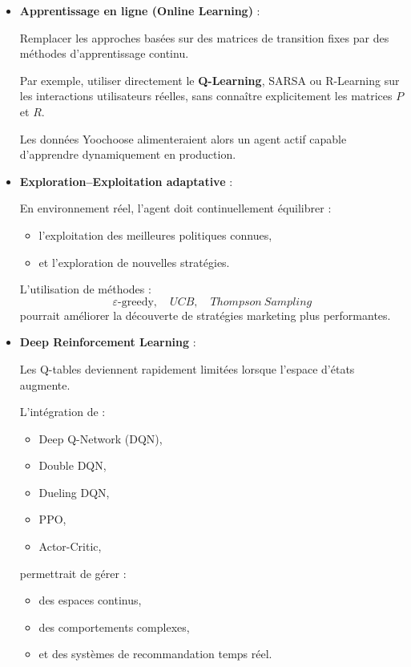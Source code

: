 \documentclass[11pt,a4paper]{article}
\begin{document}
\begin{itemize}

\item \textbf{Apprentissage en ligne (Online Learning)} :

Remplacer les approches basées
sur des matrices de transition fixes
par des méthodes d’apprentissage continu.

Par exemple,
utiliser directement le \textbf{Q-Learning},
SARSA ou R-Learning
sur les interactions utilisateurs réelles,
sans connaître explicitement
les matrices \(P\) et \(R\).

Les données Yoochoose
alimenteraient alors un agent actif
capable d’apprendre dynamiquement
en production.

\vspace{0.2cm}

\item \textbf{Exploration–Exploitation adaptative} :

En environnement réel,
l’agent doit continuellement équilibrer :
\begin{itemize}
    \item l’exploitation des meilleures politiques connues,
    \item et l’exploration de nouvelles stratégies.
\end{itemize}

L’utilisation de méthodes :
\[
\varepsilon\text{-greedy},
\quad
UCB,
\quad
Thompson\ Sampling
\]
pourrait améliorer la découverte
de stratégies marketing plus performantes.

\vspace{0.2cm}

\item \textbf{Deep Reinforcement Learning} :

Les Q-tables deviennent rapidement limitées
lorsque l’espace d’états augmente.

L’intégration de :
\begin{itemize}
    \item Deep Q-Network (DQN),
    \item Double DQN,
    \item Dueling DQN,
    \item PPO,
    \item Actor-Critic,
\end{itemize}

permettrait de gérer :
\begin{itemize}
    \item des espaces continus,
    \item des comportements complexes,
    \item et des systèmes de recommandation temps réel.
\end{itemize}


\end{itemize}
\end{document}
